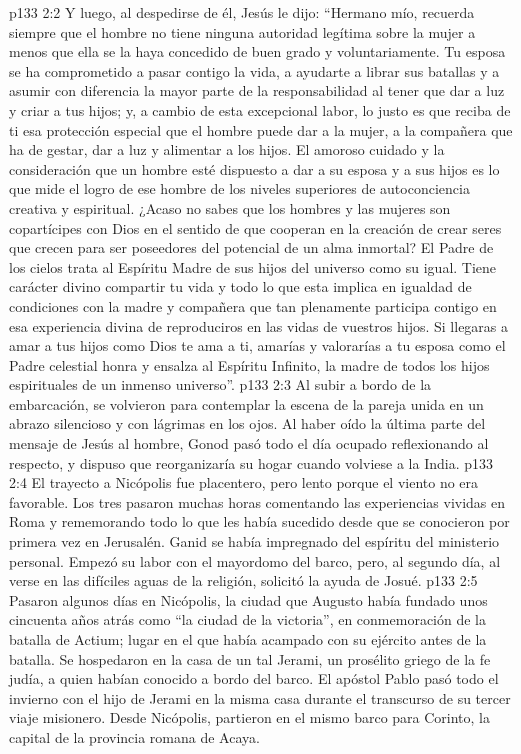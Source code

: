 \vs p133 2:2 Y luego, al despedirse de él, Jesús le dijo: “Hermano mío, recuerda siempre que el hombre no tiene ninguna autoridad legítima sobre la mujer a menos que ella se la haya concedido de buen grado y voluntariamente. Tu esposa se ha comprometido a pasar contigo la vida, a ayudarte a librar sus batallas y a asumir con diferencia la mayor parte de la responsabilidad al tener que dar a luz y criar a tus hijos; y, a cambio de esta excepcional labor, lo justo es que reciba de ti esa protección especial que el hombre puede dar a la mujer, a la compañera que ha de gestar, dar a luz y alimentar a los hijos. El amoroso cuidado y la consideración que un hombre esté dispuesto a dar a su esposa y a sus hijos es lo que mide el logro de ese hombre de los niveles superiores de autoconciencia creativa y espiritual. ¿Acaso no sabes que los hombres y las mujeres son copartícipes con Dios en el sentido de que cooperan en la creación de crear seres que crecen para ser poseedores del potencial de un alma inmortal? El Padre de los cielos trata al Espíritu Madre de sus hijos del universo como su igual. Tiene carácter divino compartir tu vida y todo lo que esta implica en igualdad de condiciones con la madre y compañera que tan plenamente participa contigo en esa experiencia divina de reproduciros en las vidas de vuestros hijos. Si llegaras a amar a tus hijos como Dios te ama a ti, amarías y valorarías a tu esposa como el Padre celestial honra y ensalza al Espíritu Infinito, la madre de todos los hijos espirituales de un inmenso universo”.
\vs p133 2:3 Al subir a bordo de la embarcación, se volvieron para contemplar la escena de la pareja unida en un abrazo silencioso y con lágrimas en los ojos. Al haber oído la última parte del mensaje de Jesús al hombre, Gonod pasó todo el día ocupado reflexionando al respecto, y dispuso que reorganizaría su hogar cuando volviese a la India.
\vs p133 2:4 El trayecto a Nicópolis fue placentero, pero lento porque el viento no era favorable. Los tres pasaron muchas horas comentando las experiencias vividas en Roma y rememorando todo lo que les había sucedido desde que se conocieron por primera vez en Jerusalén. Ganid se había impregnado del espíritu del ministerio personal. Empezó su labor con el mayordomo del barco, pero, al segundo día, al verse en las difíciles aguas de la religión, solicitó la ayuda de Josué.
\vs p133 2:5 Pasaron algunos días en Nicópolis, la ciudad que Augusto había fundado unos cincuenta años atrás como “la ciudad de la victoria”, en conmemoración de la batalla de Actium; lugar en el que había acampado con su ejército antes de la batalla. Se hospedaron en la casa de un tal Jerami, un prosélito griego de la fe judía, a quien habían conocido a bordo del barco. El apóstol Pablo pasó todo el invierno con el hijo de Jerami en la misma casa durante el transcurso de su tercer viaje misionero. Desde Nicópolis, partieron en el mismo barco para Corinto, la capital de la provincia romana de Acaya.
